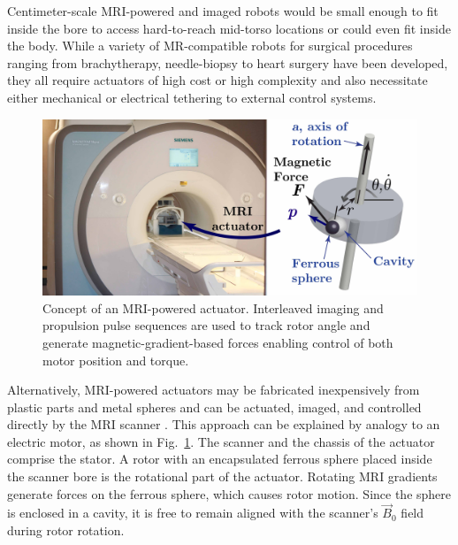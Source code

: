 \documentclass[journal]{IEEEtran}
\begin{document}
Centimeter-scale MRI-powered and imaged robots would be small enough to fit inside the bore to access hard-to-reach mid-torso locations or could even fit inside the body. While a variety of MR-compatible robots for surgical procedures ranging from brachytherapy, needle-biopsy to heart surgery have been developed\cite{song2011robotic, su2012mri, navkar2012visual, Schouten2012Biopsy, Beyersdorff2005MR, Stoianovici2014MRI, Yiallouras2014MR}, they all require actuators of high cost or high complexity and also necessitate either mechanical or electrical tethering to external control systems. 

\begin{figure}[t]
\begin{center}
	\includegraphics[width=0.95\columnwidth]{Figure1.jpg}
\end{center}
\caption{Concept of an MRI-powered actuator. Interleaved imaging and propulsion pulse sequences are used to track rotor angle and generate magnetic-gradient-based forces enabling control of both motor position and torque.
\label{fig:actuator-illustration}}
\vspace{-10pt}
\end{figure}

Alternatively, MRI-powered actuators may be fabricated inexpensively from plastic parts and metal spheres and can be actuated, imaged, and controlled directly by the MRI scanner \cite{vartholomeos2011mripowered,vartholomeos2013mri}. This approach can be explained by analogy to an electric motor, as shown in Fig.\ \ref{fig:actuator-illustration}. The scanner and the chassis of the actuator comprise the stator. A rotor with an encapsulated ferrous sphere placed inside the scanner bore is the rotational part of the actuator. Rotating MRI gradients generate forces on the ferrous sphere, which causes rotor motion. Since the sphere is enclosed in a cavity, it is free to remain aligned with the scanner's $\vec{B}_0$ field during rotor rotation. 
\end{document}
